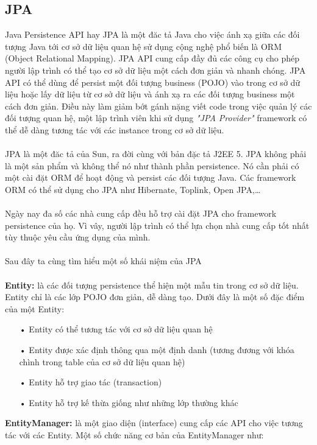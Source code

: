 \documentclass[a4paper]{article}
\begin{document}
\subsection{JPA}
Java Persistence API hay JPA là một đăc tả Java cho việc ánh xạ giữa các đối tượng Java tới cơ sở dữ liệu quan hệ sử dụng cộng nghệ phổ biến là ORM (Object Relational Mapping). JPA API cung cấp đầy đủ các công cụ cho phép người lập trình có thể tạo cơ sở dữ liệu một cách đơn giản và nhanh chóng. JPA API có thể dùng để persist một đối tượng business (POJO) vào trong cơ sở dữ liệu hoặc lấy dữ liệu từ cơ sở dữ liệu và ánh xạ ra các đối tượng business một cách đơn giản. Điều này làm giảm bớt gánh nặng viết code trong việc quản lý các đối tượng quan hệ, một lập trình viên khi sử dụng \textit{"JPA Provider"} framework có thể dễ dàng tương tác với các instance trong cơ sở dữ liệu. \\
\\
JPA là một đăc tả của Sun, ra đời cùng với bản đặc tả J2EE 5. JPA không phải là một sản phẩm và không thể nó như thành phần persistence. Nó cần phải có một cài đặt ORM để hoạt động và persist các đối tượng Java. Các framework ORM có thể sử dụng cho JPA như Hibernate, Toplink, Open JPA,…\\
\\
Ngày nay đa số các nhà cung cấp đều hỗ trợ cài đặt JPA cho framework persistence của họ. Vì vây, người lập trình có thể lựa chọn nhà cung cấp tốt nhất tùy thuộc yêu cầu ứng dụng của mình.\\
\\
Sau đây ta cùng tìm hiểu một số khái niệm của JPA\\
\\
\textbf{Entity: }là các đối tượng persistence thể hiện một mẫu tin trong cơ sở dữ liệu. Entity chỉ là các lớp POJO đơn giản, dễ dàng tạo. Dưới đây là một số đặc điểm của một Entity:
\begin{itemize}
	\item[•]Entity có thể tương tác với cơ sở dữ liệu quan hệ
	\item[•]Entity được xác định thông qua một định danh (tương đương với khóa chình trong table của cơ sở dữ liệu quan hệ)
	\item[•]Entity hỗ trợ giao tác (transaction)
	\item[•]Entity hỗ trợ kế thừa giống như những lớp thường khác
\end{itemize}
\textbf{EntityManager: }là một giao diện (interface) cung cấp các API cho việc tương tác với các Entity. Một số chức năng cơ bản của EntityManager như:
\end{document}
